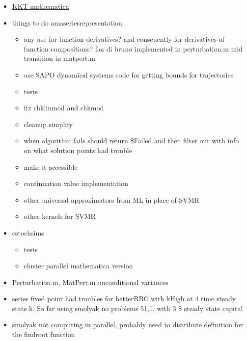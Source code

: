 \documentclass[hyperref]{labbook}
\begin{document}
\begin{itemize}
\item \href{https://mathematica.stackexchange.com/questions/135220/amelioration-of-a-karush-kuhn-tucker-nice-code}{KKT mathematica}
\item things to do amaseriesrepresentation
  \begin{itemize}
  \item any use for function derivatives? and conseuently for derivatives of function compositions?  faa di bruno implemented in perturbation.m mid transition in matpert.m 
  \item use SAPO dynamical systems code for getting bounds for trajectories
  \item tests
  \item fix chklinmod and chkmod
  \item cleanup simplify  
  \item when algorithm fails should return \$Failed and then filter out with info on what solution points had trouble
  \item make it accessible
  \item continuation value implementation
  \item other universal approximators from ML in place of SVMR
  \item other kernels for SVMR
  \end{itemize}
\item cstochsims
  \begin{itemize}
  \item tests
  \item cluster parallel mathematica version
  \end{itemize}
\item Perturbation.m, MatPert.m unconditional variances
\end{itemize}




\begin{itemize}
\item series fixed point had troubles for betterRBC with kHigh at 4 time steady state k.  So far using smolyak no problems 5{1,1,} with 3 8 steady state capital
\item smolyak not computing in parallel, probably need to distribute definition for the findroot function
\end{itemize}
\end{document}
